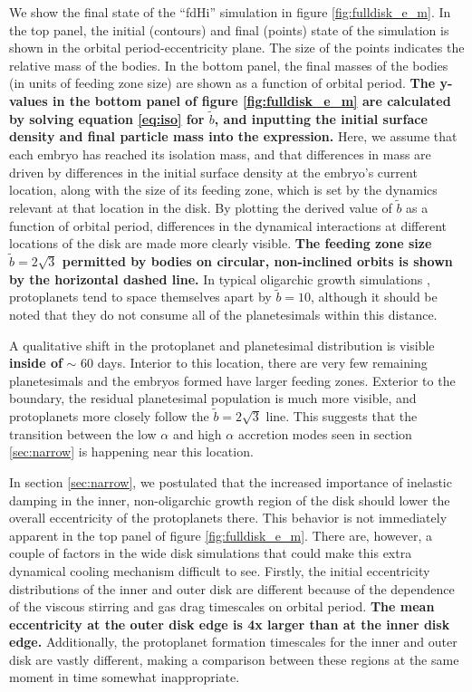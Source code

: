 \documentclass[twocolumn,linenumbers]{aastex63}
\begin{document}
We show the final state of the ``fdHi'' simulation in figure \ref{fig:fulldisk_e_m}. In the top panel,
the initial (contours) and final (points) state of the simulation is
shown in the orbital period-eccentricity plane. The size of the points
indicates the relative mass of the bodies. In the bottom panel, the
final masses of the bodies (in units of feeding zone size) are shown
as a function of orbital period. \textbf{The y-values in the bottom panel of figure \ref{fig:fulldisk_e_m} are calculated by solving equation \ref{eq:iso} for $\tilde{b}$, and inputting the initial surface density and final particle mass into the expression.} Here, we assume that each embryo has reached its isolation mass, and 
that differences in mass are driven by differences in the initial surface density at the embryo's current location, along with the 
size of its feeding zone, which is set by the dynamics relevant at that location in the disk. By plotting the derived value of $
\tilde{b}$ as a function of orbital period, differences in the dynamical interactions at different locations of the disk are made more 
clearly visible. \textbf{The feeding zone size $\tilde{b} = 2 \sqrt{3}$ permitted by bodies on circular, non-inclined orbits \citep{naka88} is shown by the
horizontal dashed line.} In typical oligarchic growth simulations \citep{kokubo98}, protoplanets tend 
to space themselves apart by $\tilde{b} = 10$, although it should be noted that they do not consume all of the planetesimals 
within this distance.

A qualitative shift in the protoplanet and planetesimal distribution is visible \textbf{inside of} $\sim$ 60 days. Interior to this location, there are 
very few remaining planetesimals and the embryos formed have larger feeding zones. Exterior to the boundary, the residual 
planetesimal population is much more visible, and protoplanets more closely follow the $\tilde{b} = 2 \sqrt{3}$ line. This 
suggests that the transition between the low $\alpha$ and high $\alpha$ accretion modes seen in section \ref{sec:narrow} 
is happening near this location.

In section \ref{sec:narrow}, we postulated that the increased importance of inelastic damping in the inner, non-oligarchic growth 
region of the disk should lower the overall eccentricity of the protoplanets there. This behavior is not immediately apparent in the 
top panel of figure \ref{fig:fulldisk_e_m}. There are, however, a couple of factors in the wide disk simulations that could make this 
extra dynamical cooling mechanism difficult to see. Firstly, the initial eccentricity distributions of the inner and outer disk are 
different because of the dependence of the viscous stirring and gas drag timescales on orbital period. \textbf{The mean eccentricity at the outer disk edge is 4x larger than at the inner disk edge.} Additionally, the 
protoplanet formation timescales for the inner and outer disk are vastly different, making a comparison between these regions at 
the same moment in time somewhat inappropriate.
\end{document}
